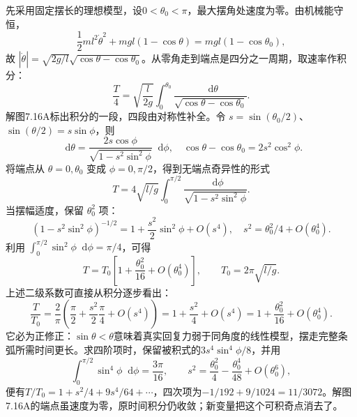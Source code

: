 \documentclass[UTF8,fontset=fandol,a4paper,11pt]{ctexart}
\newcommand{\dd}{\mathop{}\!\mathrm{d}}
\newcommand{\figcaption}[1]{\par\vspace{2pt}{\small\color{muted}#1}\par}
\begin{document}
\begin{center}\begin{minipage}{\linewidth}\centering{}\figcaption{解图 7.16A}\end{minipage}\end{center}
先采用固定摆长的理想模型，设$0<\theta_0<\pi$，最大摆角处速度为零。由机械能守恒，
\[\frac12ml^2\dot\theta^2+mgl(1-\cos\theta)
=mgl(1-\cos\theta_0),\]
故 $|\dot\theta|=\sqrt{2g/l}\sqrt{\cos\theta-\cos\theta_0}$。从零角走到端点是四分之一周期，取速率作积分：
\[\frac T4=\sqrt{\frac l{2g}}\int_0^{\theta_0}
\frac{\dd\theta}{\sqrt{\cos\theta-\cos\theta_0}}.\]
解图7.16A标出积分的一段，四段由对称性补全。令 $s=\sin(\theta_0/2)$、$\sin(\theta/2)=s\sin\phi$，则
\[\dd\theta=\frac{2s\cos\phi}{\sqrt{1-s^2\sin^2\phi}}\dd\phi,
\quad\cos\theta-\cos\theta_0=2s^2\cos^2\phi.\]
将端点从 $\theta=0,\theta_0$ 变成 $\phi=0,\pi/2$，得到无端点奇异性的形式
\[T=4\sqrt{l/g}\int_0^{\pi/2}\frac{\dd\phi}{\sqrt{1-s^2\sin^2\phi}}.\]
当摆幅适度，保留 $\theta_0^2$ 项：
\[(1-s^2\sin^2\phi)^{-1/2}=1+\frac{s^2}{2}\sin^2\phi+O(s^4),
\quad s^2=\theta_0^2/4+O(\theta_0^4).\]
利用 $\int_0^{\pi/2}\sin^2\phi\dd\phi=\pi/4$，可得
\[\boxed{T=T_0\left[1+\frac{\theta_0^2}{16}+O(\theta_0^4)\right],
\qquad T_0=2\pi\sqrt{l/g}.}\]
上述二级系数可直接从积分逐步看出：
\[\frac{T}{T_0}=\frac2\pi\left(\frac\pi2+
\frac{s^2}{2}\frac\pi4+O(s^4)\right)
=1+\frac{s^2}{4}+O(s^4)
=1+\frac{\theta_0^2}{16}+O(\theta_0^4).\]
它必为正修正：$\sin\theta<\theta$意味着真实回复力弱于同角度的线性模型，摆走完整条弧所需时间更长。求四阶项时，保留被积式的$3s^4\sin^4\phi/8$，并用
\[\int_0^{\pi/2}\sin^4\phi\dd\phi=\frac{3\pi}{16},
\qquad s^2=\frac{\theta_0^2}{4}-\frac{\theta_0^4}{48}+O(\theta_0^6),\]
便有$T/T_0=1+s^2/4+9s^4/64+\cdots$，四次项为$-1/192+9/1024=11/3072$。解图7.16A的端点虽速度为零，原时间积分仍收敛；新变量把这个可积奇点消去了。
\end{document}
